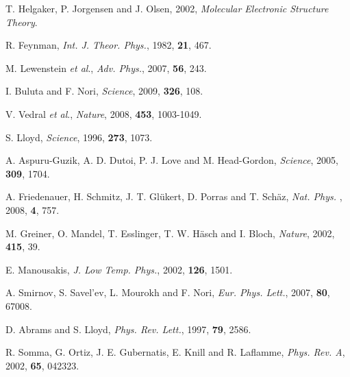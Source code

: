 \documentclass[8.5pt,twoside,twocolumn]{article}
\begin{document}



\footnotesize{
}
\begin{thebibliography}{99}
T. Helgaker, P. Jorgensen and J. Olsen, 2002, \emph{Molecular Electronic Structure Theory}.

R. Feynman, \emph{Int. J. Theor. Phys.}, 1982, \textbf{21}, 467.

M. Lewenstein \emph{et al}., \emph{Adv. Phys.}, 2007, \textbf{56}, 243.



I. Buluta and F. Nori, \emph{Science}, 2009, \textbf{326}, 108.

V. Vedral \emph{et al}., \emph{Nature}, 2008, \textbf{453}, 1003-1049.

S. Lloyd, \emph{Science}, 1996, \textbf{273}, 1073.

A. Aspuru-Guzik, A. D. Dutoi, P. J. Love and M. Head-Gordon, \emph{Science}, 2005, \textbf{309}, 1704.

A. Friedenauer, H. Schmitz, J. T. Gl\"{u}kert, D. Porras and T. Sch\"{a}z, \emph{Nat. Phys.} , 2008, \textbf{4}, 757.

M. Greiner, O. Mandel, T. Esslinger, T. W. H\"{a}sch and I. Bloch, \emph{Nature}, 2002, \textbf{415}, 39.

E. Manousakis, \emph{J. Low Temp. Phys.}, 2002, \textbf{126}, 1501.

A. Smirnov, S. Savel'ev, L. Mourokh and F. Nori, \emph{Eur. Phys. Lett.}, 2007, \textbf{80}, 67008.

D. Abrams and S. Lloyd, \emph{Phys. Rev. Lett.}, 1997, \textbf{79}, 2586.

R. Somma, G. Ortiz, J. E. Gubernatis, E. Knill and R. Laflamme, \emph{Phys. Rev. A}, 2002, \textbf{65}, 042323.


\end{thebibliography}
\end{document}
